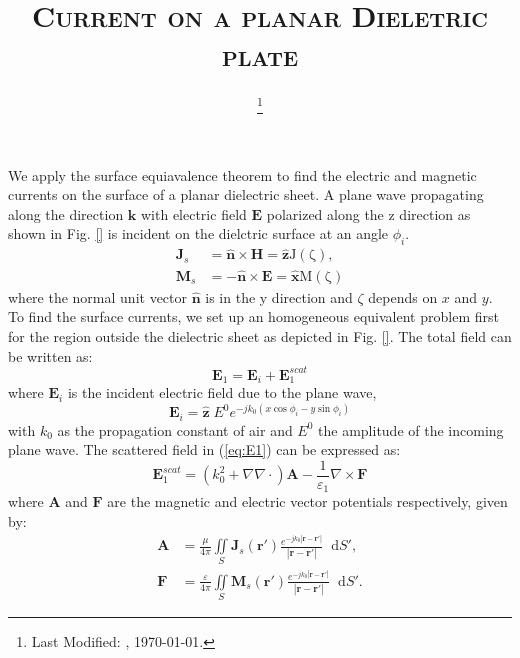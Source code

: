 \documentclass[12pt]{article}
\renewcommand{\v}[1]{\mathbf{#1}} %
\newcommand{\E}{\varepsilon}  %
\renewcommand{\u}{\mu}  %
\newcommand{\x}{\times}  %
\renewcommand{\del}{\nabla}  %
\renewcommand{\^}{\hat}  %
\newcommand*\diff{\mathop{}\!\mathrm{d}} %
\begin{document}
\title{\textsc{Current on a planar Dieletric plate}\\}
\date{\footnote{Last Modified: \currenttime, \today.}}
\maketitle
%
We apply the surface equiavalence theorem to find the electric and magnetic currents on the surface of a planar dielectric sheet. A plane wave propagating along the direction $\mathbf{k}$ with electric field $\mathbf{E}$ polarized along the z direction as shown in Fig. \ref{} is incident on the dielctric surface at an angle $\phi_i$.
%
\begin{subequations}
  \begin{align}
    \v J_s &=  \hat{\v{n}} \x \v{H} = \hat {\v{z}} \mathrm{J(\zeta)},
    \label{eq:J_s}\\
    \v M_s &=  -\hat{\v{n}} \x \v{E} = \hat {\v{x}} \mathrm{M(\zeta)}
    \label{eq:M_s}
  \end{align}
  \label{eq:eq_currents}
\end{subequations}
%
where the normal unit vector $\hat{\v{n}}$ is in the y direction and $\zeta$ depends on $x$ and $y$. To find the surface currents, we set up an homogeneous equivalent problem first for the region outside the dielectric sheet as depicted in Fig. \ref{}. The total field can be written as:
%
\begin{equation}
  \v E_1 = \v E_i + \v E_1^{scat}
  \label{eq:E1}
\end{equation}
%
where $\v E_i$ is the incident electric field due to the plane wave,
%
\begin{equation}
  \v E_i = \hat{\v z} \; E^0  e^{-j k_0 (x \cos \phi_i - y \sin \phi_i)}
  \label{eq:E_i}
\end{equation}
%
with $k_0$ as the propagation constant of air and $E^0$ the amplitude of the incoming plane wave. The scattered field in (\ref{eq:E1}) can be expressed as:
%
\begin{equation}
  \v E_1^{scat} = \left( k_0^2 + \del \del \cdot \right) \v A
  - \frac{1}{\E_1} \del \x \v F
  \label{eq:E1scat}
\end{equation}
%
where $\v A$ and $\v F$ are the magnetic and electric vector potentials respectively, given by:
%
\begin{subequations}
  \begin{align}
    \v A &=  \frac{\u}{4 \pi} \iint\limits_{S} \v J_s(\v r') \frac{ e^{-j k_0 |\v r - \v r'|}}{|\v r - \v r'|} \diff{S'},
    \label{eq:A}\\
    \v F &=  \frac{\E}{4 \pi} \iint\limits_{S} \v M_s(\v r') \frac{ e^{-j k_0 |\v r - \v r'|}}{|\v r - \v r'|} \diff{S'}.
    \label{eq:Fig}
  \end{align}
  \label{eq:potentials}
\end{subequations}
\end{document}
